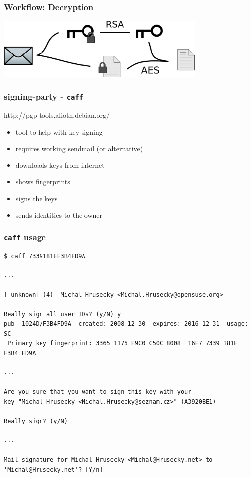 \begin{frame}
   \frametitle{Workflow: Decryption}
   \begin{center}
   \includegraphics[height=3cm]{decrypt-pgp}
   \end{center}
\end{frame}

\begin{frame}[t]
   \frametitle{signing-party - \texttt{caff}}
   {\small \hfill http://pgp-tools.alioth.debian.org/}
   \vspace{.5cm}

   \begin{itemize}
      \item tool to help with key signing
      \item requires working sendmail (or alternative)
      \item downloads keys from internet
      \item shows fingerprints
      \item signs the keys
      \item sends identities to the owner
   \end{itemize}
\end{frame}

\begin{frame}[t,fragile]
   \frametitle{\texttt{caff} usage}
\tiny
\begin{verbatim}
$ caff 7339181EF3B4FD9A

...

[ unknown] (4)  Michal Hrusecky <Michal.Hrusecky@opensuse.org>

Really sign all user IDs? (y/N) y
pub  1024D/F3B4FD9A  created: 2008-12-30  expires: 2016-12-31  usage: SC  
 Primary key fingerprint: 3365 1176 E9C0 C50C 8008  16F7 7339 181E F3B4 FD9A

...

Are you sure that you want to sign this key with your
key "Michal Hrusecky <Michal.Hrusecky@seznam.cz>" (A3920BE1)

Really sign? (y/N) 

...

Mail signature for Michal Hrusecky <Michal@Hrusecky.net> to 'Michal@Hrusecky.net'? [Y/n]

\end{verbatim}
\end{frame}

